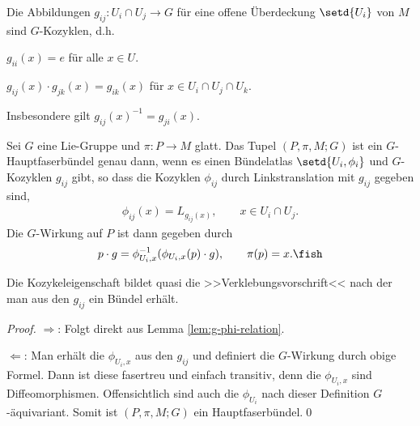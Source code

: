 \documentclass[%
	paper=a5,%
	fleqn,%
	DIV=18,%
	BCOR=0mm,
	fontsize=11pt,
	titlepage=false,%
	bibliography=totoc,
	DIV=18,%
	twoside=true,
	pdftitle=Riemannsche Geometrie,
	pdfauthor=Uwe Semmelmann,
	numbers=noendperiod]%
	{scrbook}
\begin{document}
\begin{lem}
Die Abbildungen $g_{ij}: U_i\cap U_j\to G$ für eine offene Überdeckung
$\setd{U_i}$ von $M$ sind $G$-Kozyklen, d.h.
\begin{propenum}
\item $g_{ii}(x) = e$ für alle $x\in U$.
\item $g_{ij}(x)\cdot g_{jk}(x) = g_{ik}(x)$ für $x\in U_i\cap U_j\cap U_k$.
\end{propenum}
Insbesondere gilt $g_{ij}(x)^{-1} = g_{ji}(x)$.\fish
\end{lem}

\begin{prop}
Sei $G$ eine Lie-Gruppe und $\pi: P\to M$ glatt. Das Tupel $(P,\pi,M;G)$ ist ein
$G$-Hauptfaserbündel genau dann, wenn es einen Bündelatlas
$\setd{U_i,\phi_{i}}$ und $G$-Kozyklen $g_{ij}$ gibt, so dass die Kozyklen
$\phi_{ij}$ durch Linkstranslation mit $g_{ij}$ gegeben sind,
\begin{align*}
\phi_{ij}(x) = L_{g_{ij}(x)},\qquad x\in U_i\cap U_j.
\end{align*}
Die $G$-Wirkung auf $P$ ist dann gegeben durch
\begin{align*}
p\cdot g = \phi_{U_i,x}^{-1}(\phi_{U_i,x}(p)\cdot g),\qquad \pi(p) = x.\fish
\end{align*}
\end{prop}

Die Kozykeleigenschaft bildet quasi die >>Verklebungsvorschrift<< nach der man
aus den $g_{ij}$ ein Bündel erhält.


\begin{proof}
$\Rightarrow$: Folgt direkt aus Lemma \ref{lem:g-phi-relation}.

$\Leftarrow$: Man erhält die $\phi_{U_i,x}$ aus den $g_{ij}$ und definiert die
$G$-Wirkung durch obige Formel. Dann ist diese fasertreu und einfach transitiv,
denn die $\phi_{U_i,x}$ sind Diffeomorphismen. Offensichtlich sind auch die $\phi_{U_i}$ nach dieser Definition $G$-äquivariant.
Somit ist $(P,\pi,M;G)$ ein Hauptfaserbündel.\qed
\end{proof}
\end{document}
